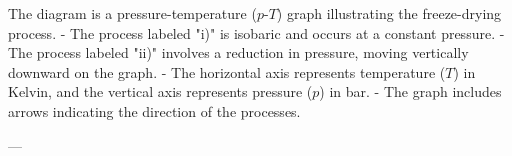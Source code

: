 The diagram is a pressure-temperature (\(p\)-\(T\)) graph illustrating the freeze-drying process.  
- The process labeled "i)" is isobaric and occurs at a constant pressure.  
- The process labeled "ii)" involves a reduction in pressure, moving vertically downward on the graph.  
- The horizontal axis represents temperature (\(T\)) in Kelvin, and the vertical axis represents pressure (\(p\)) in bar.  
- The graph includes arrows indicating the direction of the processes.

---